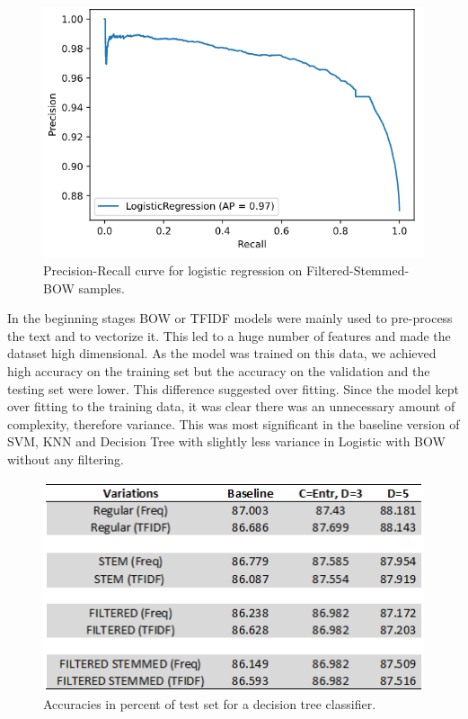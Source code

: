\documentclass[conference]{IEEEtran}
\begin{document}
\begin{figure}[htbp]
\centerline{\includegraphics[width=0.9\columnwidth]{precision-recall.png}}
\caption{Precision-Recall curve for logistic regression on Filtered-Stemmed-BOW samples.}
\label{fig}
\end{figure}
\FloatBarrier
In the beginning stages BOW or TFIDF models were mainly used to pre-process the text and to vectorize it. This led to a huge number of features and made the dataset high dimensional. As the model was trained on this data, we achieved high accuracy on the training set but the accuracy on the validation and the testing set were lower. This difference suggested over fitting. Since the model kept over fitting to the training data, it was clear there was an unnecessary amount of complexity, therefore variance. This was most significant in the baseline version of SVM, KNN and Decision Tree with slightly less variance in Logistic with BOW without any filtering. 


\begin{figure}[htbp]
\centerline{\includegraphics[width=0.9\columnwidth]{descision-tree-predition.png}}
\caption{Accuracies in percent of test set for a decision tree classifier.}
\label{fig}
\end{figure}
\end{document}

